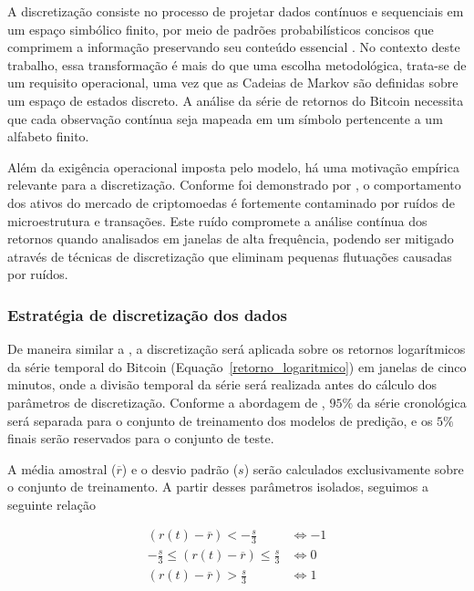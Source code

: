 \documentclass[
    12pt,                %
    openright,           %
    oneside,             %
    a4paper,             %
    english,             %
    brazil               %
]{abntex2}
\begin{document}
A discretização consiste no processo de projetar dados contínuos e sequenciais 
em um espaço simbólico finito, por meio de padrões probabilísticos concisos que 
comprimem a informação preservando seu conteúdo essencial \cite{Jha2021_arxiv}. No contexto 
deste trabalho, essa transformação é mais do que uma escolha metodológica, trata-se
de um requisito operacional, uma vez que as Cadeias de Markov são definidas sobre um espaço de estados discreto.
A análise da série de retornos do Bitcoin necessita que cada observação contínua seja 
mapeada em um símbolo pertencente a um alfabeto finito.

Além da exigência operacional imposta pelo modelo, há uma motivação empírica relevante para a discretização.
Conforme foi demonstrado por , o comportamento dos ativos do mercado de criptomoedas é fortemente
contaminado por ruídos de microestrutura e transações. Este ruído compromete a análise contínua dos retornos quando analisados
em janelas de alta frequência, podendo ser mitigado através de técnicas de discretização que eliminam pequenas flutuações causadas
por ruídos.

\subsubsection{Estratégia de discretização dos dados}
\label{discretizacao}

De maneira similar a , a discretização será aplicada sobre os retornos logarítmicos da série temporal do Bitcoin 
(Equação~\ref{retorno_logaritmico}) em janelas de cinco minutos, onde a divisão temporal da série será realizada 
antes do cálculo dos parâmetros de discretização. Conforme a abordagem de , 
$95\%$ da série cronológica será separada para o conjunto de treinamento dos modelos de predição, e os $5\%$ 
finais serão reservados para o conjunto de teste.

A média amostral ($\overline{r}$) e o desvio padrão ($s$) serão calculados exclusivamente sobre o conjunto de treinamento. 
A partir desses parâmetros isolados, seguimos a seguinte relação

\begin{equation}
    \begin{aligned}
        \left( r(t) - \overline{r} \right) < -\frac{s}{3} &\iff -1 \\
        -\frac{s}{3} \leq \left( r(t) - \overline{r} \right) \leq \frac{s}{3} &\iff 0 \\
        \left( r(t) - \overline{r} \right) > \frac{s}{3} &\iff 1 \\
    \end{aligned}
    \label{discretizacao_eq}
\end{equation}
\end{document}

